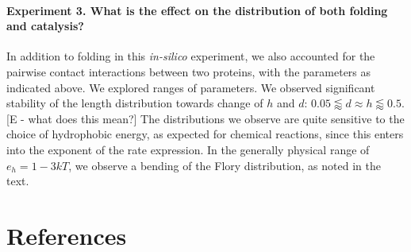 \documentclass[5p,times]{elsarticle}
\begin{document}
\paragraph{Experiment 3. What is the effect on the distribution of both folding and catalysis?}
In addition to folding in this \textit{in-silico} experiment, we also accounted for the pairwise 
contact interactions between two proteins, with the parameters as indicated above. We explored 
ranges of parameters.  We observed significant stability of the length distribution towards change 
of $h$ and $d$: $0.05\lessapprox d\approx h \lessapprox 0.5$. [E - what does this mean?]  The 
distributions we observe are quite sensitive to the choice of hydrophobic energy, as expected for 
chemical reactions, since this enters into the exponent of the rate expression. In the generally 
physical range of $e_h= 1-3 kT$, we observe a bending of the Flory distribution, as noted in the 
text.
 
\section*{References}

\end{document}
